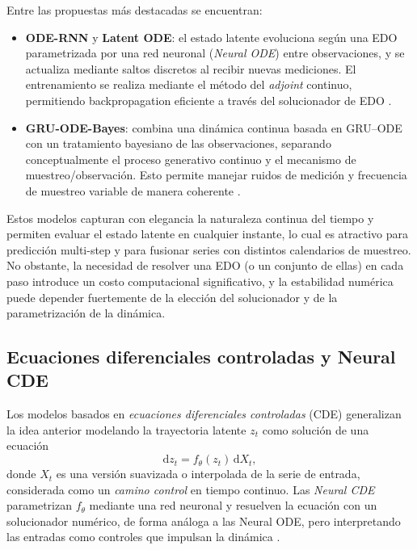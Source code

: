 Entre las propuestas más destacadas se encuentran:
\begin{itemize}
    \item \textbf{ODE-RNN} y \textbf{Latent ODE}: el estado latente evoluciona según una EDO parametrizada por una red neuronal (\emph{Neural ODE}) entre observaciones, y se actualiza mediante saltos discretos al recibir nuevas mediciones. El entrenamiento se realiza mediante el método del \emph{adjoint} continuo, permitiendo backpropagation eficiente a través del solucionador de EDO \cite{chen2018neural,yulia2019latent}.
    \item \textbf{GRU-ODE-Bayes}: combina una dinámica continua basada en GRU–ODE con un tratamiento bayesiano de las observaciones, separando conceptualmente el proceso generativo continuo y el mecanismo de muestreo/observación. Esto permite manejar ruidos de medición y frecuencia de muestreo variable de manera coherente \cite{de2019gru}.
\end{itemize}

Estos modelos capturan con elegancia la naturaleza continua del tiempo y permiten evaluar el estado latente en cualquier instante, lo cual es atractivo para predicción multi-step y para fusionar series con distintos calendarios de muestreo. No obstante, la necesidad de resolver una EDO (o un conjunto de ellas) en cada paso introduce un costo computacional significativo, y la estabilidad numérica puede depender fuertemente de la elección del solucionador y de la parametrización de la dinámica.

\subsection{Ecuaciones diferenciales controladas y Neural CDE}

Los modelos basados en \textit{ecuaciones diferenciales controladas} (CDE) generalizan la idea anterior modelando la trayectoria latente $z_t$ como solución de una ecuación
\[
    \mathrm{d} z_t = f_\theta(z_t)\, \mathrm{d} X_t,
\]
donde $X_t$ es una versión suavizada o interpolada de la serie de entrada, considerada como un \emph{camino control} en tiempo continuo. Las \textit{Neural CDE} parametrizan $f_\theta$ mediante una red neuronal y resuelven la ecuación con un solucionador numérico, de forma análoga a las Neural ODE, pero interpretando las entradas como controles que impulsan la dinámica \cite{kidger2020neural}.

\hfill

